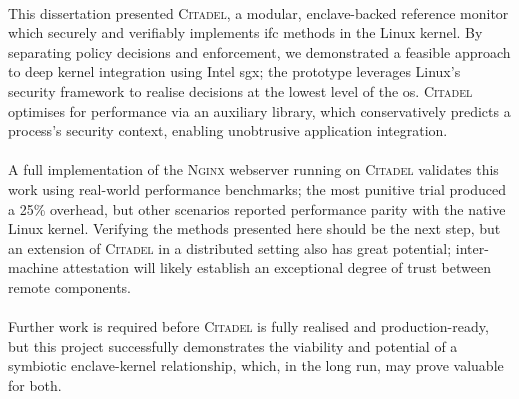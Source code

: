 \paragraph{} This dissertation presented \textsc{Citadel}, a modular, enclave-backed reference monitor which securely and verifiably implements \acrshort{ifc} methods in the Linux kernel. By separating policy decisions and enforcement, we demonstrated a feasible approach to deep kernel integration using Intel \acrshort{sgx}; the prototype leverages Linux's security framework to realise decisions at the lowest level of the \acrshort{os}. \textsc{Citadel} optimises for performance via an auxiliary library, which conservatively predicts a process's security context, enabling unobtrusive application integration.

\paragraph{} A full implementation of the \textsc{Nginx} webserver running on \textsc{Citadel} validates this work using real-world performance benchmarks; the most punitive trial produced a 25\% overhead, but other scenarios reported performance parity with the native Linux kernel. Verifying the methods presented here should be the next step, but an extension of \textsc{Citadel} in a distributed setting also has great potential; inter-machine attestation will likely establish an exceptional degree of trust between remote components.

\paragraph{} Further work is required before \textsc{Citadel} is fully realised and production-ready, but this project successfully demonstrates the viability and potential of a symbiotic enclave-kernel relationship, which, in the long run, may prove valuable for both.